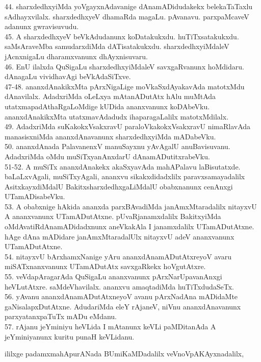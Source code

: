 \documentclass{article}
\begin{document}
44. sharxdedhxyiMda yoVgayxnAdavanige dAnamADidudakekx belekaTaTaxlu sAdhayxvilalx. sharxdedhxyeV dhamaRda magaLu. pAvanavu. parxpaMcaveV adanunx gwravisuvudu.\\
45. A sharxdedhxyeV beVkAdudanunx koDatakukxdu. huTiTxsatakukxdu. saMsAraveMba samudarxdiMda dATisatakukxdu. sharxdedhxyiMdaleV jAcnxnigaLu dharamxvanunx dhAyxnisuvaru.\\
46. EnU ilalxda QuSigaLu sharxdedhxyiMdaleV savxgaRvanunx hoMdidaru. dAnagaLu vividhavAgi beVkAdaSiTxve.\\
47-48. ananxdAnakikxMta pArxNigaLige moVkaSxdAyakavAda matotxMdu dAnavilalx. AdadxriMda oLeLxya mAtanADutAtx hAlu muMtAda utatxmapadAthaRgaLoMdige kUDida ananxvanunx koDAbeVku. ananxdAnakikxMta utatxmavAdadudx ihaparagaLalilx matotxMdilalx.\\
49. AdadxriMda suKakokxVsakxravU paraloVkakokxVsakxravU nimaRlavAda manasisxniMda ananxdAnavanunx sharxdedhxyiMda mADabeVku.\\
50. ananxdAnada PalavanenxV manuSayxnu yAvAgalU anuBavisuvanu. AdadxriMda oMdu muSiTxyanAnxdarU dAnamADutitxrabeVku.\\
51-52. A muSiTx ananxdAnakekx akaSxyavAda mahAPalavu laBisutatxde. baLaLxvAgali, muSiTxyAgali, ananxvu sikakxdidadxlilx paravxsamayadalilx AsitxkayxdiMdalU BakitxsharxdedhxgaLiMdalU obabxnanunx cenAnxgi UTamADisabeVku.\\
53. A obabxnige hAkida ananxda parxBAvadiMda janAmxMtaradalilx nitayxvU A ananxvanunx UTamADutAtxne. pUvaRjanamxdalilx BakitxyiMda oMdAvatiRdAnamADidadxnunx aneVkakAla I janamxdalilx UTamADutAtxne. hAge dAna mADidare janAmxMtaradalUlx nitayxvU adeV ananxvanunx UTamADutAtxne.\\
54. nitayxvU bArxhamxNanige yAru ananxdAnamADutAtxreyoV avaru miSATxnanxvanunx UTamADutAtx savxgaRkekx hoVgutAtxre.\\
55. veVdapAragarAda QuSigaLu ananxvanunx pArxNarUpavanAnxgi heVLutAtxre. saMdeVhavilalx. ananxvu amaqtadiMda huTiTxdudaSeTx.\\
56. yAvanu ananxdAnamADutAtxneyoV avanu pArxNadAna mADidaMte gaNisalapxDutAtxne. AdudariMda eleY rAjaneV, niVnu ananxdAnavanunx parxyatanxpaTuTx mADu eMdanu.\\
57. rAjanu jeYminiyu heVLida I mAtanunx keVLi paMDitanAda A jeYminiyanunx kuritu punaH keVLidanu.

\begin{center}
ililxge padamxmahApurANada BUmiKaMDadalilx veVnoVpAKAyxnadalilx,
\end{center}
\end{document}
